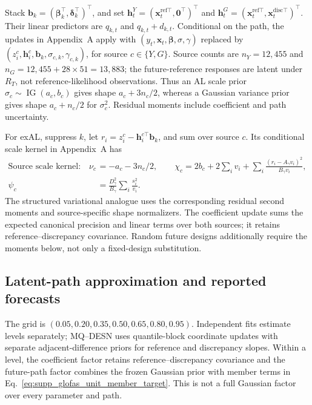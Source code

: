 \documentclass[12pt,letterpaper]{article}
\newcommand{\vect}[1]{\bm{#1}}
\newcommand{\IG}{\operatorname{IG}}
\numberwithin{suppalgorithm}{section}
\numberwithin{equation}{section}
\numberwithin{table}{section}
\numberwithin{figure}{section}
\begin{document}
Stack \(\vect b_k=(\vect\beta_k^\top,\vect\delta_k^\top)^\top\),
and set \(\vect h_t^Y=(\vect x_t^{\mathrm{ref}\top},\vect0^\top)^\top\)
and \(\vect h_t^G=(\vect x_t^{\mathrm{ref}\top},
\vect x_t^{\mathrm{disc}\top})^\top\). Their linear predictors are
\(q_{k,t}\) and \(q_{k,t}+d_{k,t}\). Conditional on the path, the
updates in Appendix~A apply with
\((y_t,\vect x_t,\vect\beta,\sigma,\gamma)\) replaced by
\((z_i^c,\vect h_i^c,\vect b_k,\sigma_{c,k},\gamma_{c,k})\),
for source \(c\in\{Y,G\}\). Source counts are
\(n_Y=12{,}455\) and
\(n_G=12{,}455+28\times51=13{,}883\); the future-reference responses
are latent under \(R_T\), not reference-likelihood observations. Thus an AL scale prior
\(\sigma_c\sim\IG(a_c,b_c)\) gives shape \(a_c+3n_c/2\), whereas
a Gaussian variance prior gives shape \(a_c+n_c/2\) for
\(\sigma_c^2\). Residual moments include coefficient and path uncertainty.

For exAL, suppress \(k\), let
\(r_i=z_i^c-\vect h_i^{c\top}\vect b_k\), and sum over source
\(c\). Its conditional scale kernel in Appendix~A has
\begin{equation}
\begin{aligned}
\text{Source scale kernel:}\quad
\nu_c&=-a_c-3n_c/2,\qquad
\chi_c=2b_c+2\sum_i v_i+
\sum_i\frac{(r_i-A_\gamma v_i)^2}{B_\gamma v_i},\\
\psi_c&=\frac{D_\gamma^2}{B_\gamma}\sum_i\frac{s_i^2}{v_i}.
\end{aligned}
\label{eq:supp_glofas_unit_exal_updates}
\end{equation}
The structured variational analogue uses the corresponding residual
second moments and source-specific shape normalizers. The coefficient
update sums the expected canonical precision and linear terms over both
sources; it retains reference--discrepancy covariance. Random future
designs additionally require the moments below, not only a fixed-design
substitution.

\subsection{Latent-path approximation and reported forecasts}
\label{subsec:glofas_latent_path}

The grid is \((0.05,0.20,0.35,0.50,0.65,0.80,0.95)\).
Independent fits estimate levels separately; MQ--DESN uses quantile-block
coordinate updates with separate adjacent-difference priors for reference
and discrepancy slopes. Within a level, the coefficient factor retains
reference--discrepancy covariance and the future-path factor combines the
frozen Gaussian prior with member terms in
Eq.~\eqref{eq:supp_glofas_unit_member_target}.
This is not a full Gaussian factor over every parameter and path.
\end{document}
